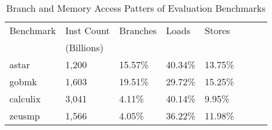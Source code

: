 \begin{table}[t]
  \centering
  \caption{Branch and Memory Access Patters of Evaluation Benchmarks}
  \label{tab:benchstats}
\begin{tabular}{lllllrrr}
\hline
Benchmark & Inst Count & Branches & Loads & Stores \\
 & (Billions) &  &  &  \\
\hline
astar & 1,200 & 15.57\% & 40.34\% & 13.75\% \\
gobmk & 1,603 & 19.51\% & 29.72\% & 15.25\% \\
calculix & 3,041 & 4.11\% & 40.14\% & 9.95\% \\
zeusmp & 1,566 & 4.05\% & 36.22\% & 11.98\% \\
\hline
\end{tabular}
\end{table}
\begin{comment}
#+ORGTBL: SEND perfmetrics orgtbl-to-latex :splice t :skip 0
| Benchmark | Inst Count | Branches | Loads   | Stores  |
|           | (Billions) |          |         |         |
|-----------+------------+----------+---------+---------|
| astar     | 1,200      | 15.57\%  | 40.34\% | 13.75\% |
| gobmk     | 1,603      | 19.51\%  | 29.72\% | 15.25\% |
| calculix  | 3,041      | 4.11\%   | 40.14\% | 9.95\%  |
| zeusmp    | 1,566      | 4.05\%   | 36.22\% | 11.98\% |
|-----------+------------+----------+---------+---------|
\end{comment}

